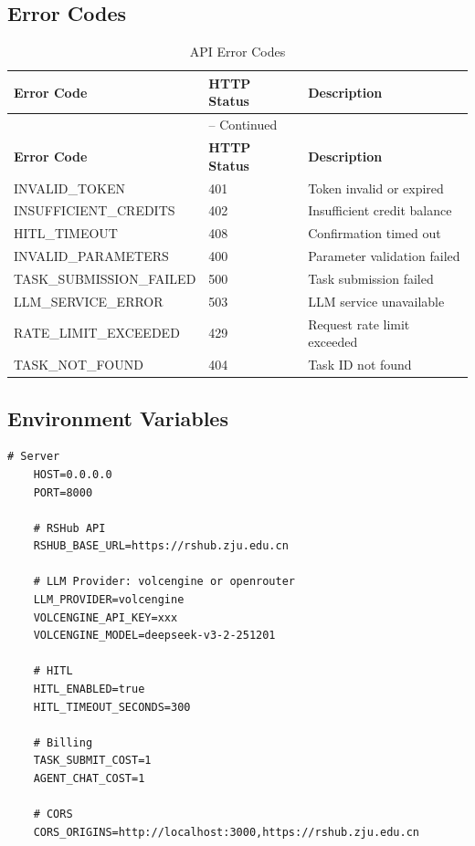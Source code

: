 \subsection{Error Codes}

\begin{longtable}{@{}llp{5cm}@{}}
	\caption{API Error Codes} \\
	\toprule
	\textbf{Error Code} & \textbf{HTTP Status} & \textbf{Description} \\
	\midrule
	\endfirsthead
	\multicolumn{3}{c}{\tablename\ \thetable{} -- Continued} \\
	\toprule
	\textbf{Error Code} & \textbf{HTTP Status} & \textbf{Description} \\
	\midrule
	\endhead
	\bottomrule
	\endfoot
	INVALID\_TOKEN & 401 & Token invalid or expired \\
	INSUFFICIENT\_CREDITS & 402 & Insufficient credit balance \\
	HITL\_TIMEOUT & 408 & Confirmation timed out \\
	INVALID\_PARAMETERS & 400 & Parameter validation failed \\
	TASK\_SUBMISSION\_FAILED & 500 & Task submission failed \\
	LLM\_SERVICE\_ERROR & 503 & LLM service unavailable \\
	RATE\_LIMIT\_EXCEEDED & 429 & Request rate limit exceeded \\
	TASK\_NOT\_FOUND & 404 & Task ID not found \\
\end{longtable}

\subsection{Environment Variables}

\begin{lstlisting}[basicstyle=\ttfamily\scriptsize]
	# Server
	HOST=0.0.0.0
	PORT=8000
	
	# RSHub API
	RSHUB_BASE_URL=https://rshub.zju.edu.cn
	
	# LLM Provider: volcengine or openrouter
	LLM_PROVIDER=volcengine
	VOLCENGINE_API_KEY=xxx
	VOLCENGINE_MODEL=deepseek-v3-2-251201
	
	# HITL
	HITL_ENABLED=true
	HITL_TIMEOUT_SECONDS=300
	
	# Billing
	TASK_SUBMIT_COST=1
	AGENT_CHAT_COST=1
	
	# CORS
	CORS_ORIGINS=http://localhost:3000,https://rshub.zju.edu.cn
\end{lstlisting}
